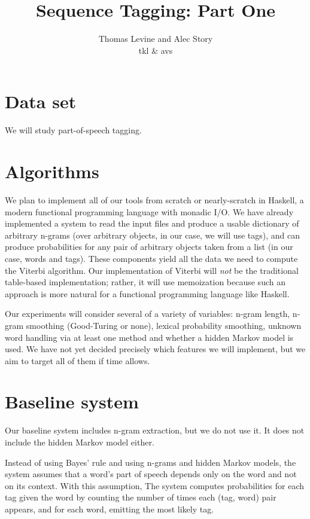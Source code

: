 \documentclass{article}
\title{Sequence Tagging: Part One}
\author{Thomas Levine and Alec Story\\\small{tkl\osn{22} \& avs\osn{38}}}
\begin{document}
\maketitle
\section{Data set}
We will study part-of-speech tagging.
\section{Algorithms}

We plan to implement all of our tools from scratch or nearly-scratch in Haskell,
a modern functional programming language with monadic I/O.  We have already
implemented a system to read the input files and produce a usable dictionary of
arbitrary n-grams (over arbitrary objects, in our case, we will use tags), and
can produce probabilities for any pair of arbitrary objects taken from a list
(in our case, words and tags).  These components yield all the data we need to
compute the Viterbi algorithm.  Our implementation of Viterbi will \emph{not} be
the traditional table-based implementation; rather, it will use memoization
because such an approach is more natural for a functional programming language
like Haskell.

Our experiments will consider several of a variety of variables: n-gram length,
n-gram smoothing (Good-Turing or none), lexical probability smoothing, unknown
word handling via at least one method and whether a hidden Markov model is used.
We have not yet decided precisely which features we will implement, but we
aim to target all of them if time allows.

\section{Baseline system}
Our baseline system includes n-gram extraction,
but we do not use it.
It does not include the hidden Markov model either.

Instead of using Bayes' rule and using n-grams and hidden Markov models,
the system assumes that a word's part of speech depends only
on the word and not on its context. With this assumption,
The system computes probabilities for each tag given the word by counting the
number of times each (tag, word) pair appears, and for each word, emitting the
most likely tag.
\end{document}
